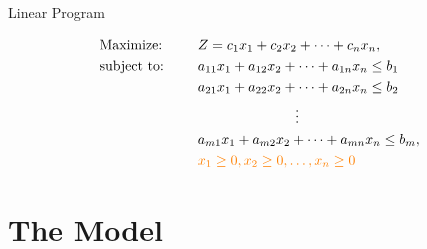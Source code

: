 \documentclass[10pt, compress]{beamer}
\begin{document}
\begin{frame}{Linear Program}

\begin{alignat*}{2}
  & \text{Maximize: } & & Z = c_1x_1 + c_2x_2 + \dots + c_nx_n, \\
   & \text{subject to: }& \quad & a_{11}x_1 + a_{12}x_2 + \dots + a_{1n}x_n \leq b_1 \\
   & & &  a_{21}x_1 + a_{22}x_2 + \dots + a_{2n}x_n \leq b_2 \\  
   & &  & \quad \quad \quad \quad \quad \quad \quad \vdots \\
   & & &  a_{m1}x_1 + a_{m2}x_2 + \dots + a_{mn}x_n \leq b_m, \\   
   & & & \color{orange}  x_1 \geq 0, x_2 \geq 0, \dots ,  x_n \geq 0
     \end{alignat*}

\end{frame}










\section{The Model}

\end{document}
